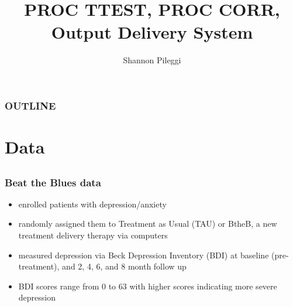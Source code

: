 



\title[Lecture 11]{PROC TTEST, PROC CORR, Output Delivery System}
\author[Pileggi]{Shannon Pileggi}


\date{}




\begin{frame}
\titlepage
\end{frame}

\begin{frame}
\frametitle{OUTLINE\qquad\qquad\qquad} \tableofcontents[hideallsubsections]
\end{frame}



\section[The data]{Data}
\subsection{}

\begin{frame}
\frametitle{Beat the Blues data}
\begin{itemize}
    \item
    enrolled patients with depression/anxiety
    \item
    randomly assigned them to Treatment as Usual (TAU) or BtheB, a new treatment delivery therapy via computers
    \item
    measured depression via Beck Depression Inventory (BDI) at baseline (pre-treatment), and 2, 4, 6, and 8 month follow up
    \item
    BDI scores range from 0 to 63 with higher scores indicating more severe depression
\end{itemize}
\end{frame}


%
%
%

